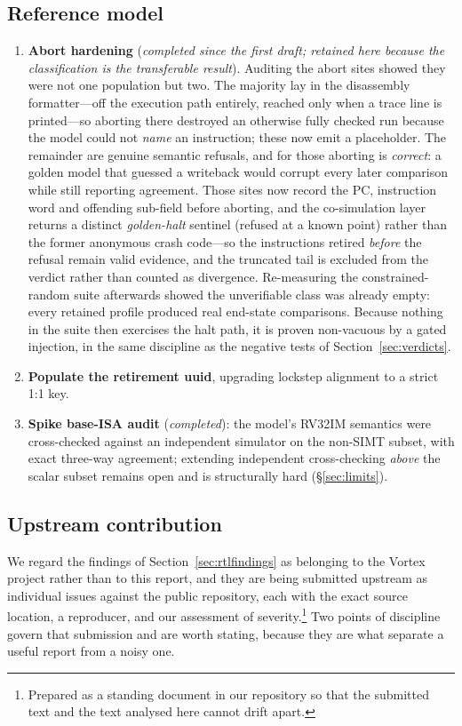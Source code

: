 \documentclass[conference]{IEEEtran}
\begin{document}
\subsection{Reference model}
\begin{enumerate}
\item \textbf{Abort hardening} (\emph{completed since the first draft;
retained here because the classification is the transferable result}).
Auditing the abort sites showed they were not one population but two.
The majority lay in the disassembly formatter---off the execution path
entirely, reached only when a trace line is printed---so aborting there
destroyed an otherwise fully checked run because the model could not
\emph{name} an instruction; these now emit a placeholder. The remainder
are genuine semantic refusals, and for those aborting is
\emph{correct}: a golden model that guessed a writeback would corrupt
every later comparison while still reporting agreement. Those sites now
record the PC, instruction word and offending sub-field before
aborting, and the co-simulation layer returns a distinct
\emph{golden-halt} sentinel (refused at a known point) rather than the
former anonymous crash code---so the instructions retired \emph{before}
the refusal remain valid evidence, and the truncated tail is excluded
from the verdict rather than counted as divergence. Re-measuring the
constrained-random suite afterwards showed the unverifiable class was
already empty: every retained profile produced real end-state
comparisons. Because nothing in the suite then exercises the halt path,
it is proven non-vacuous by a gated injection, in the same discipline
as the negative tests of Section~\ref{sec:verdicts}.
\item \textbf{Populate the retirement uuid}, upgrading lockstep
alignment to a strict 1:1 key.
\item \textbf{Spike base-ISA audit} (\emph{completed}): the model's
RV32IM semantics were cross-checked against an independent simulator on
the non-SIMT subset, with exact three-way agreement; extending independent
cross-checking \emph{above} the scalar subset remains open and is
structurally hard (\S\ref{sec:limits}).
\end{enumerate}

\subsection{Upstream contribution}
\label{sec:upstream}

We regard the findings of Section~\ref{sec:rtlfindings} as belonging to the
Vortex project rather than to this report, and they are being submitted
upstream as individual issues against the public repository, each with
the exact source location, a reproducer, and our assessment of
severity.\footnote{Prepared as a standing document in our repository so
that the submitted text and the text analysed here cannot drift apart.}
Two points of discipline govern that submission and are worth stating,
because they are what separate a useful report from a noisy one.
\end{document}
